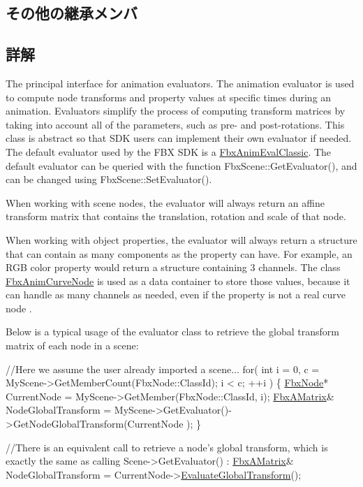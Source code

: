 \subsection*{その他の継承メンバ}


\subsection{詳解}
The principal interface for animation evaluators. The animation evaluator is used to compute node transforms and property values at specific times during an animation. Evaluators simplify the process of computing transform matrices by taking into account all of the parameters, such as pre-\/ and post-\/rotations. This class is abstract so that S\+DK users can implement their own evaluator if needed. The default evaluator used by the F\+BX S\+DK is a \hyperlink{class_fbx_anim_eval_classic}{Fbx\+Anim\+Eval\+Classic}. The default evaluator can be queried with the function Fbx\+Scene\+::\+Get\+Evaluator(), and can be changed using Fbx\+Scene\+::\+Set\+Evaluator().

When working with scene nodes, the evaluator will always return an affine transform matrix that contains the translation, rotation and scale of that node.

When working with object properties, the evaluator will always return a structure that can contain as many components as the property can have. For example, an R\+GB color property would return a structure containing 3 channels. The class \hyperlink{class_fbx_anim_curve_node}{Fbx\+Anim\+Curve\+Node} is used as a data container to store those values, because it can handle as many channels as needed, even if the property is not a real curve node .

Below is a typical usage of the evaluator class to retrieve the global transform matrix of each node in a scene\+: 
\begin{DoxyCode}
\textcolor{comment}{//Here we assume the user already imported a scene...}
\textcolor{keywordflow}{for}( \textcolor{keywordtype}{int} i = 0, c = MyScene->GetMemberCount(FbxNode::ClassId); i < c; ++i )
\{
    \hyperlink{class_fbx_node}{FbxNode}* CurrentNode = MyScene->GetMember(FbxNode::ClassId, i);
    \hyperlink{class_fbx_a_matrix}{FbxAMatrix}& NodeGlobalTransform = MyScene->GetEvaluator()->GetNodeGlobalTransform(CurrentNode
      );
\}

\textcolor{comment}{//There is an equivalent call to retrieve a node's global transform, which is exactly the same as calling
       Scene->GetEvaluator() :}
\hyperlink{class_fbx_a_matrix}{FbxAMatrix}& NodeGlobalTransform = CurrentNode->\hyperlink{class_fbx_node_a534da99b3ad911158013482a1b08f630}{EvaluateGlobalTransform}();
\end{DoxyCode}


